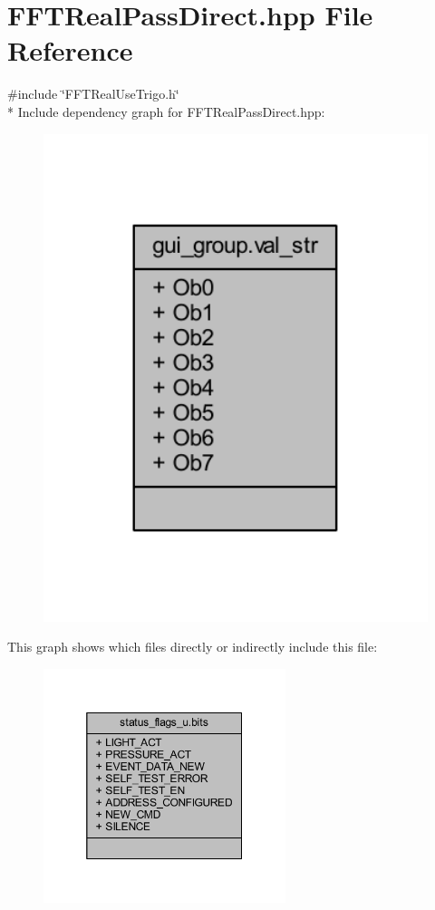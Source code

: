 \hypertarget{a00101}{\section{F\+F\+T\+Real\+Pass\+Direct.\+hpp File Reference}
\label{a00101}
}
{\ttfamily \#include \char`\"{}F\+F\+T\+Real\+Use\+Trigo.\+h\char`\"{}}\\*
Include dependency graph for F\+F\+T\+Real\+Pass\+Direct.\+hpp\+:
\nopagebreak
\begin{figure}[H]
\begin{center}
\leavevmode
\includegraphics[width=350pt]{da/d53/a00265}
\end{center}
\end{figure}
This graph shows which files directly or indirectly include this file\+:
\nopagebreak
\begin{figure}[H]
\begin{center}
\leavevmode
\includegraphics[width=200pt]{d5/d35/a00266}
\end{center}
\end{figure}
